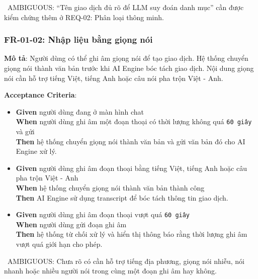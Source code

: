 \warningicon\  AMBIGUOUS: “Tên giao dịch đủ rõ để LLM suy đoán danh mục” cần được kiểm chứng thêm ở REQ-02: Phân loại thông minh.



\subsubsection{FR-01-02: Nhập liệu bằng giọng nói}

\textbf{Mô tả}: Người dùng có thể ghi âm giọng nói để tạo giao dịch. Hệ thống chuyển giọng nói thành văn bản trước khi AI Engine bóc tách giao dịch. Nội dung giọng nói cần hỗ trợ tiếng Việt, tiếng Anh hoặc câu nói pha trộn Việt - Anh.



\textbf{Acceptance Criteria}:

\begin{itemize}
\item \textbf{Given} người dùng đang ở màn hình chat  \\ \hspace*{1.5em}  \textbf{When} người dùng ghi âm một đoạn thoại có thời lượng không quá \texttt{60 giây} và gửi  \\ \hspace*{1.5em}  \textbf{Then} hệ thống chuyển giọng nói thành văn bản và gửi văn bản đó cho AI Engine xử lý.
\item \textbf{Given} người dùng ghi âm đoạn thoại bằng tiếng Việt, tiếng Anh hoặc câu pha trộn Việt - Anh  \\ \hspace*{1.5em}  \textbf{When} hệ thống chuyển giọng nói thành văn bản thành công  \\ \hspace*{1.5em}  \textbf{Then} AI Engine sử dụng transcript để bóc tách thông tin giao dịch.
\item \textbf{Given} người dùng ghi âm đoạn thoại vượt quá \texttt{60 giây}  \\ \hspace*{1.5em}  \textbf{When} người dùng gửi đoạn ghi âm  \\ \hspace*{1.5em}  \textbf{Then} hệ thống từ chối xử lý và hiển thị thông báo rằng thời lượng ghi âm vượt quá giới hạn cho phép.
\end{itemize}
\warningicon\  AMBIGUOUS: Chưa rõ có cần hỗ trợ tiếng địa phương, giọng nói nhiễu, nói nhanh hoặc nhiều người nói trong cùng một đoạn ghi âm hay không.



